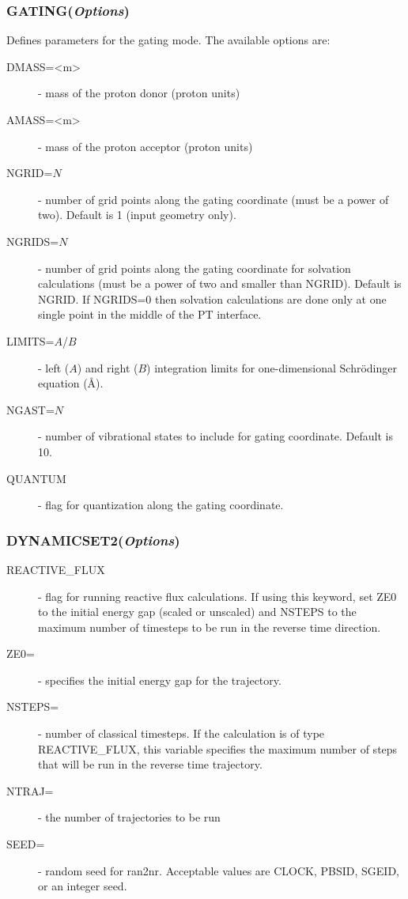\documentclass[oneside,11pt,openany]{book}
\newcommand{\tw}{\ttfamily}
\begin{document}
\subsubsection*{GATING({\it Options})}
%
Defines parameters for the gating mode. The available options are:
\begin{description}
\item[{\tw DMASS=<m>}] - mass of the proton donor (proton units)

\item[{\tw AMASS=<m>}] - mass of the proton acceptor (proton units)

\item[{\tw NGRID=$N$}] - number of grid points along the
gating coordinate (must be a power of two). Default is 1
(input geometry only).

\item[{\tw NGRIDS=$N$}] - number of grid points along the
gating coordinate for solvation calculations
(must be a power of two and smaller than NGRID). Default is NGRID.
If {\tw NGRIDS=0} then solvation calculations are done only at one
single point in the middle of the PT interface.

\item[{\tw LIMITS=$A$/$B$}] - left ($A$) and right ($B$) integration
limits for one-dimensional Schr\"odinger equation (\AA).

\item[{\tw NGAST=$N$}] - number of vibrational states to include
for gating coordinate. Default is 10.

\item[{\tw QUANTUM}] - flag for quantization along the gating coordinate.

\end{description}

\subsubsection*{DYNAMICSET2({\it Options})}
\begin{description}
\item[{\tw REACTIVE\_FLUX}] - flag for running reactive flux calculations.  If using this keyword, set ZE0 to the initial energy gap (scaled or unscaled) and NSTEPS to the maximum number of timesteps to be run in the reverse time direction.
 
\item[{\tw ZE0=}] - specifies the initial energy gap for the trajectory.  

\item[{\tw NSTEPS=}] - number of classical timesteps.  If the calculation is of type {\tw REACTIVE\_FLUX}, this variable specifies the maximum number of steps that will be run in the reverse time trajectory.

\item[{\tw NTRAJ=}] - the number of trajectories to be run

\item[{\tw SEED=}] - random seed for ran2nr.  Acceptable values are CLOCK, PBSID, SGEID, or an integer seed.

\end{description}
\end{document}
